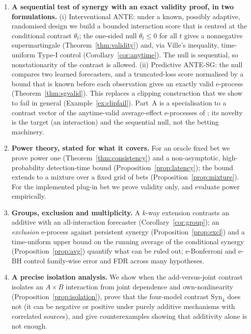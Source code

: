 \documentclass[pdflatex,sn-mathphys-ay]{sn-jnl}%
\theoremstyle{thmstyleone}%
\theoremstyle{thmstyletwo}%
\theoremstyle{thmstylethree}%
\newcommand{\Syn}{\mathrm{Syn}}
\begin{document}
\begin{enumerate}
\item \textbf{A sequential test of synergy with an exact validity proof, in two
formulations.} (i) Interventional ANTE: under a known, possibly adaptive, randomised
design we build a bounded interaction score that is centred at the conditional
contrast $\theta_t$; the one-sided null $\theta_t\le0$ for all $t$ gives a nonnegative
supermartingale (Theorem~\ref{thm:validity}) and, via Ville's inequality, time-uniform
Type-I control (Corollary~\ref{cor:anytime}). The null is sequential, so
nonstationarity of the contrast is allowed. (ii) Predictive ANTE-SG: the null compares
two learned forecasters, and a truncated-loss score normalised by a bound that is
known before each observation gives an exactly valid e-process
(Theorem~\ref{thm:sgvalid}). This replaces a clipping construction that we show
to fail in general (Example~\ref{ex:clipfail}). Part~A is a specialisation to a contrast vector of the anytime-valid average-effect e-processes of \citet{waudbysmith2024ope}; its novelty is the target (an interaction) and the sequential null, not the betting machinery.

\item \textbf{Power theory, stated for what it covers.} For an oracle fixed bet we prove
power one (Theorem~\ref{thm:consistency}) and a non-asymptotic, high-probability
detection-time bound (Proposition~\ref{prop:latency}); the bound extends to a mixture
over a fixed grid of bets (Proposition~\ref{prop:mixture}). For the implemented plug-in
bet we prove validity only, and evaluate power empirically.

\item \textbf{Groups, exclusion and multiplicity.} A $k$-way extension contrasts an
additive with an all-interaction forecaster (Corollary~\ref{cor:group}); an
\emph{exclusion} e-process against persistent synergy (Proposition~\ref{prop:excl}) and a time-uniform upper bound on the running average of the conditional synergy (Proposition~\ref{prop:avg}) quantify what can be ruled out; e-Bonferroni and e-BH control family-wise error and FDR
across many hypotheses.

\item \textbf{A precise isolation analysis.} We show when the add-versus-joint contrast
isolates an $A\times B$ interaction from joint dependence and own-nonlinearity
(Proposition~\ref{prop:isolation}), prove that the four-model contrast $\Syn_4$ does not (it can be negative or positive under purely additive
mechanisms with correlated sources), and give counterexamples showing that
additivity alone is not enough.


\end{enumerate}
\end{document}
